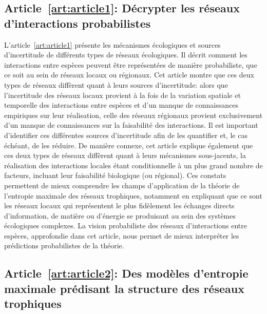 \subsection{Article~\ref{art:article1}: Décrypter les réseaux d'interactions probabilistes} 

L'article~\ref{art:article1} présente les mécanismes écologiques et sources
d'incertitude de différents types de réseaux écologiques. Il décrit comment les
interactions entre espèces peuvent être représentées de manière probabiliste,
que ce soit au sein de réseaux locaux ou régionaux. Cet article montre que ces
deux types de réseaux diffèrent quant à leurs sources d'incertitude: alors que
l'incertitude des réseaux locaux provient à la fois de la variation spatiale et
temporelle des interactions entre espèces et d'un manque de connaissances
empiriques sur leur réalisation, celle des réseaux régionaux provient
exclusivement d'un manque de connaissances sur la faisabilité des interactions.
Il est important d'identifier ces différentes sources d'incertitude afin de les
quantifier et, le cas échéant, de les réduire. De manière connexe, cet article
explique également que ces deux types de réseaux diffèrent quant à leurs
mécanismes sous-jacents, la réalisation des interactions locales étant
conditionnelle à un plus grand nombre de facteurs, incluant leur faisabilité
biologique (ou régional). Ces constats permettent de mieux comprendre les champs
d'application de la théorie de l'entropie maximale des réseaux trophiques,
notamment en expliquant que ce sont les réseaux locaux qui représentent le plus
fidèlement les échanges directs d'information, de matière ou d'énergie se
produisant au sein des systèmes écologiques complexes. La vision probabiliste
des réseaux d'interactions entre espèces, approfondie dans cet article, nous
permet de mieux interpréter les prédictions probabilistes de la théorie.

\subsection{Article~\ref{art:article2}: Des modèles d'entropie maximale prédisant la structure des réseaux trophiques} 

